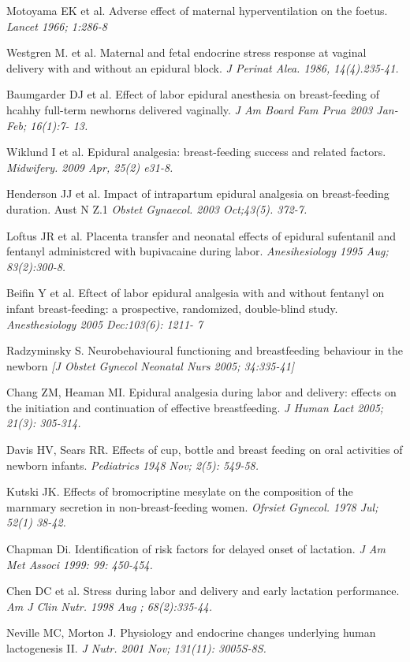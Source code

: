\documentclass[]{article}
\begin{document}
Motoyama EK et al. Adverse effect of maternal hyperventilation on the
foetus. \emph{Lancet 1966; 1:286-8}

Westgren M. et al. Maternal and fetal endocrine stress response at
vaginal delivery with and without an epidural block. \emph{J Perinat
Alea. 1986, 14(4).235-41.}

Baumgarder DJ et al. Effect of labor epidural anesthesia on
breast-feeding of hcahhy full-term newhorns delivered vaginally. \emph{J
Am Board Fam Prua 2003 Jan-Feb; 16(1):7- 13.}

Wiklund I et al. Epidural analgesia: breast-feeding success and related
factors. \emph{Midwifery. 2009 Apr, 25(2) e31-8.}

Henderson JJ et al. Impact of intrapartum epidural analgesia on
breast-feeding duration. Aust N Z.1 \emph{Obstet Gynaecol. 2003
Oct;43(5). 372-7.}

Loftus JR et al. Placenta transfer and neonatal effects of epidural
sufentanil and fentanyl administcred with bupivacaine during labor.
\emph{Anesihesiology 1995 Aug; 83(2):300-8.}

Beifin Y et al. Eftect of labor epidural analgesia with and without
fentanyl on infant breast-feeding: a prospective, randomized,
double-blind study. \emph{Anesthesiology 2005 Dec:103(6): 1211- 7}

Radzyminsky S. Neurobehavioural functioning and breastfeeding behaviour
in the newborn \emph{{[}J Obstet Gynecol Neonatal Nurs 2005;
34:335-41{]}}

Chang ZM, Heaman MI. Epidural analgesia during labor and delivery:
effects on the initiation and continuation of effective breastfeeding.
\emph{J Human Lact 2005; 21(3): 305-314.}

Davis HV, Sears RR. Effects of cup, bottle and breast feeding on oral
activities of newborn infants. \emph{Pediatrics 1948 Nov; 2(5): 549-58.}

Kutski JK. Effects of bromocriptine mesylate on the composition of the
marnmary secretion in non-breast-feeding women. \emph{Ofrsiet Gynecol.
1978 Jul; 52(1) 38-42.}

Chapman Di. Identification of risk factors for delayed onset of
lactation. \emph{J Am Met Associ 1999: 99: 450-454.}

Chen DC et al. Stress during labor and delivery and early lactation
performance. \emph{Am J Clin Nutr. 1998 Aug ; 68(2):335-44. }

Neville MC, Morton J. Physiology and endocrine changes underlying human
lactogenesis II. \emph{J Nutr. 2001 Nov; 131(11): 3005S-8S. }
\end{document}
